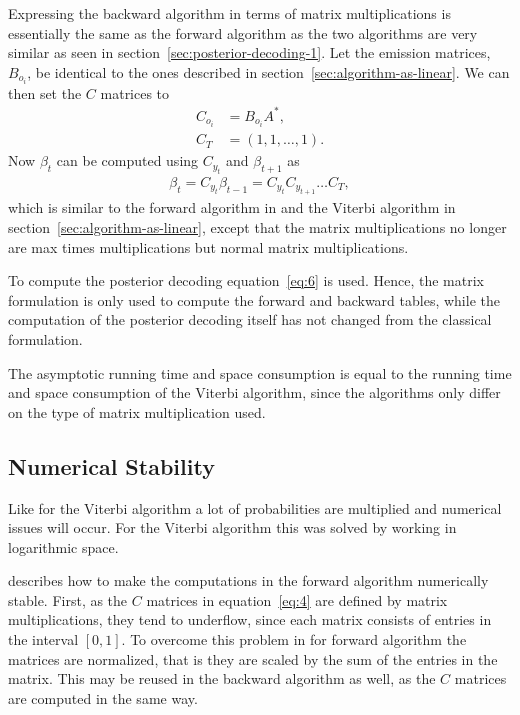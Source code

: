 Expressing the backward algorithm in terms of matrix multiplications is
essentially the same as the forward algorithm as the two algorithms are very
similar as seen in section~\ref{sec:posterior-decoding-1}. Let the emission
matrices, $B_{o_i}$, be identical to the ones described in
section~\ref{sec:algorithm-as-linear}. We can then set the $C$ matrices to
\begin{equation}
  \label{eq:4}
  \begin{aligned}
    C_{o_i} & = B_{o_i} A^*, \\
    C_T & = (1, 1, \dots, 1).
  \end{aligned}
\end{equation}
Now $\beta_t$ can be computed using $C_{y_t}$ and $\beta_{t + 1}$ as
\begin{equation}
  \label{eq:5}
  \begin{aligned}
    \beta_t = C_{y_t} \beta_{t - 1} = C_{y_t} C_{y_{t+1}}\dots C_T,
  \end{aligned}
\end{equation}
which is similar to the forward algorithm in \citet{sand2013ziphmmlib} and the
Viterbi algorithm in section~\ref{sec:algorithm-as-linear}, except that the
matrix multiplications no longer are max times multiplications but normal
matrix multiplications.

To compute the posterior decoding equation~\eqref{eq:6} is used. Hence, the
matrix formulation is only used to compute the forward and backward tables,
while the computation of the posterior decoding itself has not changed from the
classical formulation.

The asymptotic running time and space consumption is equal to the running time
and space consumption of the Viterbi algorithm, since the algorithms only
differ on the type of matrix multiplication used.

\subsection{Numerical Stability}

Like for the Viterbi algorithm a lot of probabilities are multiplied and
numerical issues will occur. For the Viterbi algorithm this was solved by
working in logarithmic space.

\citet{sand2013ziphmmlib} describes how to make the computations in the forward
algorithm numerically stable. First, as the $C$ matrices in
equation~\eqref{eq:4} are defined by matrix multiplications, they tend to
underflow, since each matrix consists of entries in the interval $[0, 1]$. To
overcome this problem in for forward algorithm the matrices are normalized,
that is they are scaled by the sum of the entries in the matrix. This may be
reused in the backward algorithm as well, as the $C$ matrices are computed in
the same way.


